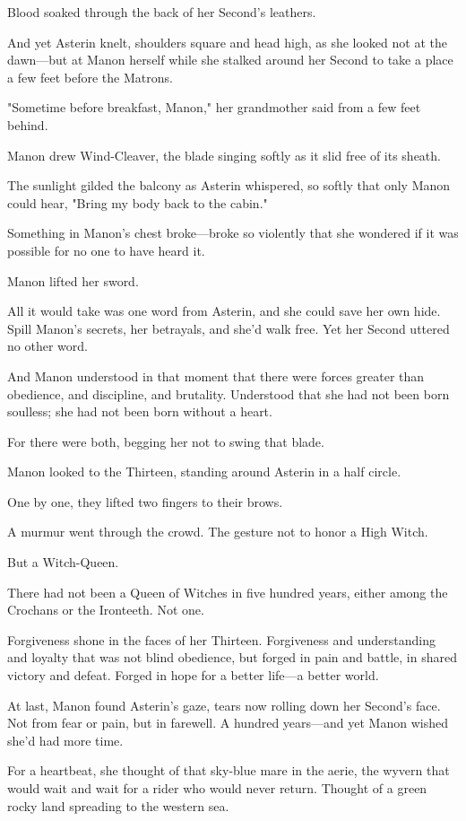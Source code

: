 Blood soaked through the back of her Second's leathers.

And yet Asterin knelt, shoulders square and head high, as she looked not at the dawn---but at Manon herself while she stalked around her Second to take a place a few feet before the Matrons.

"Sometime before breakfast, Manon," her grandmother said from a few feet behind.

Manon drew Wind-Cleaver, the blade singing softly as it slid free of its sheath.

The sunlight gilded the balcony as Asterin whispered, so softly that only Manon could hear, "Bring my body back to the cabin."

Something in Manon's chest broke---broke so violently that she wondered if it was possible for no one to have heard it.

Manon lifted her sword.

All it would take was one word from Asterin, and she could save her own hide. Spill Manon's secrets, her betrayals, and she'd walk free. Yet her Second uttered no other word.

And Manon understood in that moment that there were forces greater than obedience, and discipline, and brutality. Understood that she had not been born soulless; she had not been born without a heart.

For there were both, begging her not to swing that blade.

Manon looked to the Thirteen, standing around Asterin in a half circle.

One by one, they lifted two fingers to their brows.

A murmur went through the crowd. The gesture not to honor a High Witch.

But a Witch-Queen.

There had not been a Queen of Witches in five hundred years, either among the Crochans or the Ironteeth. Not one.

Forgiveness shone in the faces of her Thirteen. Forgiveness and understanding and loyalty that was not blind obedience, but forged in pain and battle, in shared victory and defeat. Forged in hope for a better life---a better world.

At last, Manon found Asterin's gaze, tears now rolling down her Second's face. Not from fear or pain, but in farewell. A hundred years---and yet Manon wished she'd had more time.

For a heartbeat, she thought of that sky-blue mare in the aerie, the wyvern that would wait and wait for a rider who would never return. Thought of a green rocky land spreading to the western sea.

